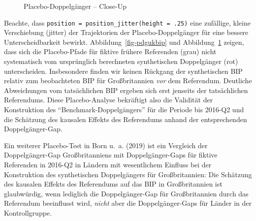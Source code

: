 \documentclass[
  a4paper,
  DIV=11,
  oneside]{scrreprt}
\begin{document}
\begin{figure}[t]


\caption{\label{fig-pdgukbipcu}Placebo-Doppelgänger -- Close-Up}

\end{figure}%

Beachte, dass \texttt{position\ =\ position\_jitter(height\ =\ .25)}
eine zufällige, kleine Verschiebung (jitter) der Trajektorien der
Placebo-Doppelgänger für eine bessere Unterscheidbarkeit bewirkt.
Abbildung~\ref{fig-pdgukbip} und Abbildung~\ref{fig-pdgukbipcu} zeigen,
dass sich die Placebo-Pfade für fiktive frühere Referenden (grau) nicht
systematisch vom ursprünglich berechneten synthetischen Doppelgänger
(rot) unterscheiden. Insbesondere finden wir keinen Rückgang der
synthetischen BIP relativ zum beobachteten BIP für Großbritannien
\emph{vor} dem Referendum. Deutliche Abweichungen vom tatsächlichen BIP
ergeben sich erst jenseits der tatsächlichen Referendums. Diese
Placebo-Analyse bekräftigt also die Validität der Konstruktion des
``Benchmark-Doppelgängers'' für die Periode bis 2016-Q2 und die
Schätzung des kausalen Effekts des Referendums anhand der entsprechenden
Doppelgänger-Gap.

Ein weiterer Placebo-Test in Born u.~a. (2019) ist ein Vergleich der
Doppelgänger-Gap Großbritanniens mit Doppelgänger-Gaps für fiktive
Referenden in 2016-Q2 in Ländern mit wesentlichem Einfluss bei der
Konstruktion des synthetischen Doppelgängers für Großbritannien: Die
Schätzung des kausalen Effekts des Referendums auf das BIP in
Großbritannien ist glaubwürdig, wenn lediglich die Doppelgänger-Gap für
Großbritannien durch das Referendum beeinflusst wird, \emph{nicht} aber
die Doppelgänger-Gaps für Länder in der Kontrollgruppe.
\end{document}
